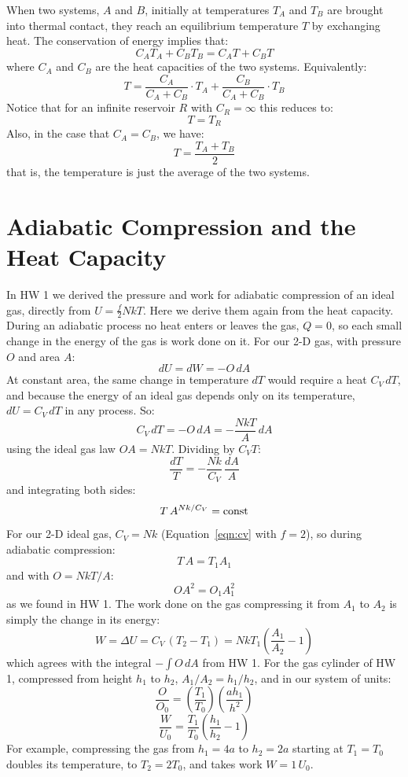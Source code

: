 \documentclass[12pt]{article}
\begin{document}
When two systems, $A$ and $B$, initially at temperatures $T_A$ and $T_B$ are brought into thermal contact, they reach an equilibrium temperature $T$ by exchanging heat.  The conservation of energy implies that:
$$C_A T_A + C_B T_B = C_A T + C_B T$$
where $C_A$ and $C_B$ are the heat capacities of the two systems.  Equivalently:
\begin{equation}
\label{eqn:tcontact}
T = \frac{C_A}{C_A + C_B} \cdot T_A + \frac{C_B}{C_A + C_B} \cdot T_B
\end{equation}
Notice that for an infinite reservoir $R$ with $C_R = \infty$ this reduces to:
$$T = T_R$$
Also, in the case that $C_A = C_B$, we have:
$$T = \frac{T_A + T_B}{2}$$
that is, the temperature is just the average of the two systems.

\section{Adiabatic Compression and the Heat Capacity}

In HW 1 we derived the pressure and work for adiabatic compression of
an ideal gas, directly from $U = \frac{f}{2}NkT$.  Here we derive them
again from the heat capacity.  During an adiabatic process no heat
enters or leaves the gas, $Q=0$, so each small change in the energy of
the gas is work done on it.  For our 2-D gas, with pressure $O$ and
area $A$:
$$dU = dW = -O\,dA$$
At constant area, the same change in temperature $dT$ would require a
heat $C_V\,dT$, and because the energy of an ideal gas depends only on
its temperature, $dU = C_V\,dT$ in any process.  So:
$$C_V\,dT = -O\,dA = -\frac{NkT}{A}\,dA$$
using the ideal gas law $OA = NkT$.  Dividing by $C_V T$:
$$\frac{dT}{T} = -\frac{Nk}{C_V}\,\frac{dA}{A}$$
and integrating both sides:
\begin{equation}
\label{eqn:tacv}
T\,A^{Nk/C_V} = {\rm const}
\end{equation}
For our 2-D ideal gas, $C_V = Nk$ (Equation~\ref{eqn:cv} with $f=2$),
so during adiabatic compression:
\begin{equation}
\label{eqn:tadi}
T\,A = T_1 A_1
\end{equation}
and with $O = NkT/A$:
$$O A^2 = O_1 A_1^2$$
as we found in HW 1.  The work done on the gas compressing it from
$A_1$ to $A_2$ is simply the change in its energy:
\begin{equation}
\label{eqn:wcv}
W = \Delta U = C_V\,(T_2 - T_1) = N k T_1 \left( \frac{A_1}{A_2} - 1 \right)
\end{equation}
which agrees with the integral $-\int O\,dA$ from HW 1.  For the gas
cylinder of HW 1, compressed from height $h_1$ to $h_2$, $A_1/A_2 =
h_1/h_2$, and in our system of units:
\begin{equation}
\label{eqn:oadi}
\frac{O}{O_0} = \left( \frac{T_1}{T_0} \right) \left( \frac{a h_1}{h^2} \right)
\end{equation}
\begin{equation}
\label{eqn:wadi}
\frac{W}{U_0} = \frac{T_1}{T_0} \left( \frac{h_1}{h_2} - 1 \right)
\end{equation}
For example, compressing the gas from $h_1 = 4a$ to $h_2 = 2a$
starting at $T_1 = T_0$ doubles its temperature, to $T_2 = 2T_0$, and
takes work $W = 1\,U_0$.
\end{document}
